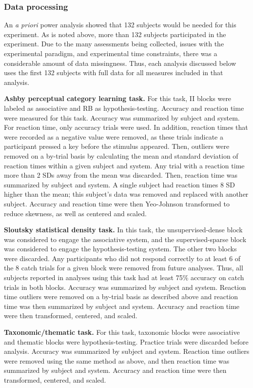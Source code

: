 \documentclass[../dissertation.tex]{subfiles}
\begin{document}
\subsubsection{Data processing}
	An \textit{a priori} power analysis showed that 132 subjects would be needed for this experiment. As is noted above, more than 132 subjects participated in the experiment. Due to the many assessments being collected, issues with the experimental paradigm, and experimental time constraints, there was a considerable amount of data missingness. Thus, each analysis discussed below uses the first 132 subjects with full data for all measures included in that analysis. \par
	\textbf{Ashby perceptual category learning task.} For this task, II blocks were labeled as associative and RB as hypothesis-testing. Accuracy and reaction time were measured for this task. Accuracy was summarized by subject and system. For reaction time, only accuracy trials were used. In addition, reaction times that were recorded as a negative value were removed, as these trials indicate a participant pressed a key before the stimulus appeared. Then, outliers were removed on a by-trial basis by calculating the mean and standard deviation of reaction times within a given subject and system. Any trial with a reaction time more than 2 SDs away from the mean was discarded. Then, reaction time was summarized by subject and system. A single subject had reaction times 8 SD higher than the mean; this subject's data was removed and replaced with another subject. Accuracy and reaction time were then Yeo-Johnson transformed to reduce skewness, as well as centered and scaled. \par
	\textbf{Sloutsky statistical density task.} In this task, the unsupervised-dense block was considered to engage the associative system, and the supervised-sparse block was considered to engage the hypothesis-testing system. The other two blocks were discarded. Any participants who did not respond correctly to at least 6 of the 8 catch trials for a given block were removed from future analyses. Thus, all subjects reported in analyses using this task had at least 75\% accuracy on catch trials in both blocks. Accuracy was summarized by subject and system. Reaction time outliers were removed on a by-trial basis as described above and reaction time was then summarized by subject and system. Accuracy and reaction time were then transformed, centered, and scaled. \par
	\textbf{Taxonomic/thematic task.} For this task, taxonomic blocks were associative and thematic blocks were hypothesis-testing. Practice trials were discarded before analysis. Accuracy was summarized by subject and system. Reaction time outliers were removed using the same method as above, and then reaction time was summarized by subject and system. Accuracy and reaction time were then transformed, centered, and scaled. \par
\end{document}
